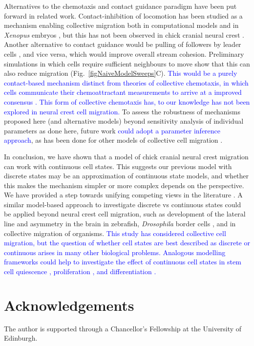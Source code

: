 \documentclass[review]{elsarticle}
\newcommand\hl[1]{{\textcolor{blue}{#1}}}
\begin{document}
Alternatives to the chemotaxis and contact guidance paradigm have been put forward in related work. Contact-inhibition of locomotion has been studied as a mechanism enabling collective migration both in computational models and in \textsl{Xenopus} embryos \cite{Carmona-Fontaine2011}, but this has not been observed in chick cranial neural crest \cite{Genuth2018}. Another alternative to contact guidance would be pulling of followers by leader cells \cite{Yates2018}, and vice versa, which would improve overall stream cohesion. Preliminary simulations in which cells require sufficient neighbours to move show that this can also reduce migration (Fig.~\ref{figNaiveModelSweeps}C). \hl{This would be a purely contact-based mechanism distinct from theories of collective chemotaxis, in which cells communicate their chemoattractant measurements to arrive at a improved consensus \cite{Camley2016}. This form of collective chemotaxis has, to our knowledge has not been explored in neural crest cell migration.} To assess the robustness of mechanisms proposed here (and alternative models) beyond sensitivity analysis of individual parameters as done here, future work \hl{could adopt a parameter inference approach}, as has been done for other models of collective cell migration \cite{Ross2017}.

In conclusion, we have shown that a model of chick cranial neural crest migration can work with continuous cell states. This suggests our previous model with discrete states may be an approximation of continuous state models, and whether this makes the mechanism simpler or more complex depends on the perspective. We have provided a step towards unifying competing views in the literature \cite{Schumacher2016a}. A similar model-based approach to investigate discrete vs continuous states could be applied beyond neural crest cell migration, such as development of the lateral line \cite{Dona2013} and asymmetry in the brain \cite{Roussigne2018} in zebrafish, \textsl{Drosophila} border cells \cite{Inaki2012}, and in collective migration of organisms. \hl{This study has considered collective cell migration, but the question of whether cell states are best described as discrete or continuous arises in many other biological problems. Analogous modelling frameworks could help to investigate the effect of continuous cell states in stem cell quiescence \cite{Basak2018}, proliferation \cite{Macklin2017,Yates2017}, and differentiation \cite{Greulich2016,Stumpf2017}.} 

\section*{Acknowledgements} The author is supported through a Chancellor's Fellowship at the University of Edinburgh.%
\end{document}
